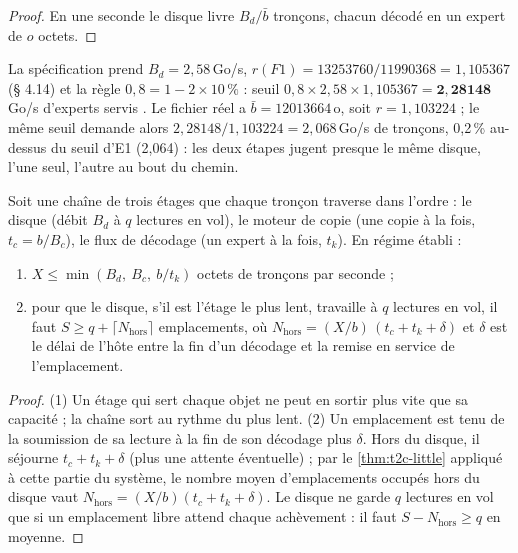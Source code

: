 \begin{proof}
En une seconde le disque livre $B_d / \bar b$ tronçons, chacun décodé en un expert de $o$ octets.
\end{proof}

La spécification prend $B_d = 2{,}58$\,Go/s, $r(F1) = \num{13253760} / \num{11990368} = 1{,}105367$ (§ 4.14) et la règle $0{,}8 = 1 - 2 \times 10\,\%$ : seuil $0{,}8 \times 2{,}58 \times 1{,}105367 = \mathbf{2{,}28148}$\,Go/s d'experts servis \calc. Le fichier réel a $\bar b = \num{12013664}$\,o, soit $r = 1{,}103224$ ; le même seuil demande alors $2{,}28148 / 1{,}103224 = 2{,}068$\,Go/s de tronçons, 0,2\,\% au-dessus du seuil d'E1 (2,064) : les deux étapes jugent presque le même disque, l'une seul, l'autre au bout du chemin.

\begin{theoreme}\label{thm:t2c-chaine}
Soit une chaîne de trois étages que chaque tronçon traverse dans l'ordre : le disque (débit $B_d$ à $q$ lectures en vol), le moteur de copie (une copie à la fois, $t_c = b/B_c$), le flux de décodage (un expert à la fois, $t_k$). En régime établi :
\begin{enumerate}
\item $X \le \min(B_d,\ B_c,\ b/t_k)$ octets de tronçons par seconde ;
\item pour que le disque, s'il est l'étage le plus lent, travaille à $q$ lectures en vol, il faut $S \ge q + \lceil N_{\mathrm{hors}} \rceil$ emplacements, où $N_{\mathrm{hors}} = (X/b)\,(t_c + t_k + \delta)$ et $\delta$ est le délai de l'hôte entre la fin d'un décodage et la remise en service de l'emplacement.
\end{enumerate}
\end{theoreme}

\begin{proof}
(1) Un étage qui sert chaque objet ne peut en sortir plus vite que sa capacité ; la chaîne sort au rythme du plus lent. (2) Un emplacement est tenu de la soumission de sa lecture à la fin de son décodage plus $\delta$. Hors du disque, il séjourne $t_c + t_k + \delta$ (plus une attente éventuelle) ; par le \cref{thm:t2c-little} appliqué à cette partie du système, le nombre moyen d'emplacements occupés hors du disque vaut $N_{\mathrm{hors}} = (X/b)(t_c + t_k + \delta)$. Le disque ne garde $q$ lectures en vol que si un emplacement libre attend chaque achèvement : il faut $S - N_{\mathrm{hors}} \ge q$ en moyenne.
\end{proof}

